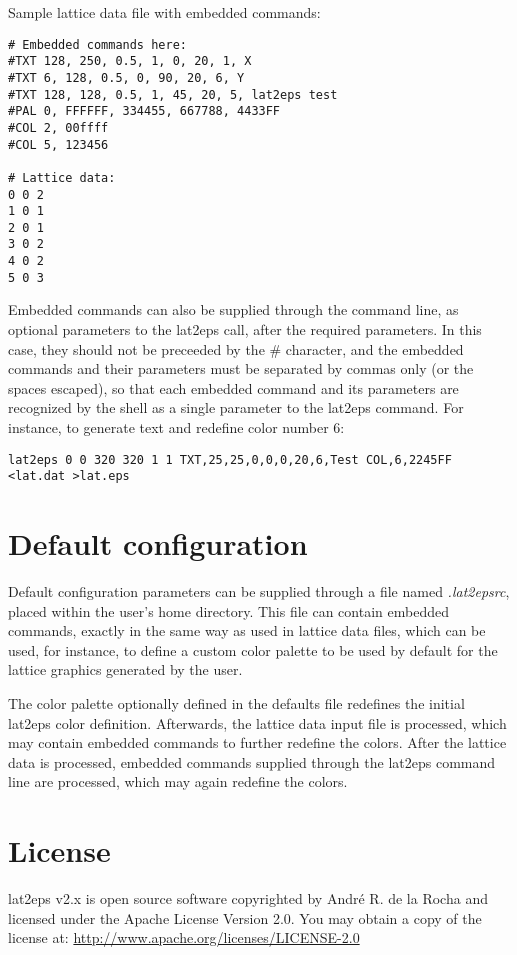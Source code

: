 \documentclass[a4paper]{article}
\begin{document}
Sample lattice data file with embedded commands:
\bigbreak

\begin{lstlisting}
# Embedded commands here:
#TXT 128, 250, 0.5, 1, 0, 20, 1, X
#TXT 6, 128, 0.5, 0, 90, 20, 6, Y
#TXT 128, 128, 0.5, 1, 45, 20, 5, lat2eps test
#PAL 0, FFFFFF, 334455, 667788, 4433FF
#COL 2, 00ffff
#COL 5, 123456

# Lattice data:
0 0 2
1 0 1
2 0 1
3 0 2
4 0 2
5 0 3
\end{lstlisting}

\bigbreak

Embedded commands can also be supplied through the command line, as optional parameters to the lat2eps call, after the required parameters. In this case, they should not be preceeded by the \# character, and the embedded commands and their parameters must be separated by commas only (or the spaces escaped), so that each embedded command and its parameters are recognized by the shell as a single parameter to the lat2eps command. For instance, to generate text and redefine color number 6:
\bigbreak

\texttt{lat2eps 0 0 320 320 1 1 TXT,25,25,0,0,0,20,6,Test COL,6,2245FF <lat.dat >lat.eps}
\bigbreak


\section{Default configuration}

Default configuration parameters can be supplied through a file named \textit{.lat2epsrc}, placed within the user's home directory. This file can contain embedded commands, exactly in the same way as used in lattice data files, which can be used, for instance, to define a custom color palette to be used by default for the lattice graphics generated by the user.
\bigbreak

The color palette optionally defined in the defaults file redefines the initial lat2eps color definition. Afterwards, the lattice data input file is processed, which may contain embedded commands to further redefine the colors. After the lattice data is processed, embedded commands supplied through the lat2eps command line are processed, which may again redefine the colors.
\bigbreak


\section{License}

lat2eps v2.x is open source software copyrighted by André R. de la Rocha and licensed under the Apache License Version 2.0. You may obtain a copy of the license at: \url{http://www.apache.org/licenses/LICENSE-2.0}
\end{document}
